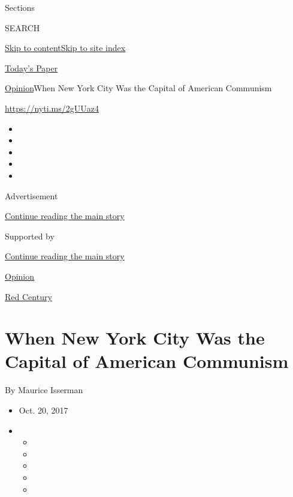 Sections

SEARCH

\protect\hyperlink{site-content}{Skip to
content}\protect\hyperlink{site-index}{Skip to site index}

\href{https://myaccount.nytimes.com/auth/login?response_type=cookie\&client_id=vi}{}

\href{https://www.nytimes.com/section/todayspaper}{Today's Paper}

\href{/section/opinion}{Opinion}\textbar{}When New York City Was the
Capital of American Communism

\href{https://nyti.ms/2gUUaz4}{https://nyti.ms/2gUUaz4}

\begin{itemize}
\item
\item
\item
\item
\item
\end{itemize}

Advertisement

\protect\hyperlink{after-top}{Continue reading the main story}

Supported by

\protect\hyperlink{after-sponsor}{Continue reading the main story}

\href{/section/opinion}{Opinion}

\href{/column/red-century}{Red Century}

\hypertarget{when-new-york-city-was-the-capital-of-american-communism}{%
\section{When New York City Was the Capital of American
Communism}\label{when-new-york-city-was-the-capital-of-american-communism}}

By Maurice Isserman

\begin{itemize}
\item
  Oct. 20, 2017
\item
  \begin{itemize}
  \item
  \item
  \item
  \item
  \item
  \end{itemize}
\end{itemize}

